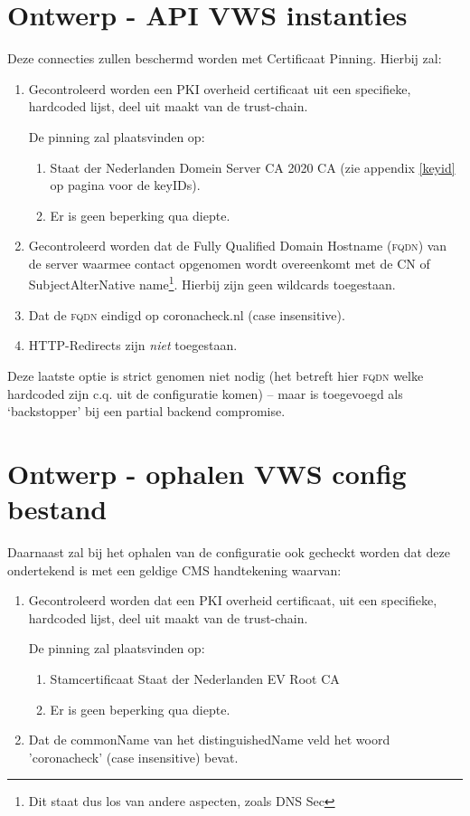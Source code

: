 \documentclass[11.0pt]{report}
\begin{document}
\ifdefined\testsonly
\else
\pagebreak
\section{Ontwerp - API VWS instanties}
\label{api}

Deze connecties zullen beschermd worden met Certificaat Pinning. Hierbij zal:

\begin{enumerate}
\item	Gecontroleerd worden een PKI overheid certificaat uit een specifieke, hardcoded lijst, deel uit maakt van de trust-chain.

De pinning zal plaatsvinden op:
\begin{enumerate}
\item Staat der Nederlanden Domein Server CA 2020 CA (zie appendix \ref{keyid} op pagina \pageref{keyid} voor de keyIDs).
\item Er is geen beperking qua diepte.
\end{enumerate}
\item 	Gecontroleerd worden dat de Fully Qualified Domain Hostname (\textsc{fqdn}) van de server waarmee contact opgenomen wordt overeenkomt met de CN of SubjectAlterNative name\footnote{Dit staat dus los van andere aspecten, zoals DNS Sec}. Hierbij zijn geen wildcards toegestaan. 
\item 	Dat de \textsc{fqdn} eindigd op coronacheck.nl (case insensitive).
\item HTTP-Redirects zijn \emph{niet} toegestaan.
\end{enumerate}

Deze laatste optie is strict genomen niet nodig (het betreft hier \textsc{fqdn} welke hardcoded zijn c.q. uit de configuratie komen) -- maar is toegevoegd als `backstopper' bij een partial backend compromise.

\section{Ontwerp - ophalen VWS config bestand}
\label{config}

Daarnaast zal bij het ophalen van de configuratie ook gecheckt worden dat deze ondertekend is met een geldige CMS handtekening waarvan:

\begin{enumerate}
\item	Gecontroleerd worden dat een PKI overheid certificaat, uit een specifieke, hardcoded lijst, deel uit maakt van de trust-chain.

De pinning zal plaatsvinden op:
\begin{enumerate}
\item Stamcertificaat Staat der Nederlanden EV Root CA
\item Er is geen beperking qua diepte.
\end{enumerate}
\item	Dat de commonName van het distinguishedName veld het woord 'coronacheck' (case insensitive) bevat.
\end{enumerate}
\end{document}

